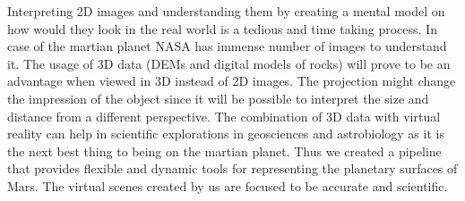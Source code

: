Interpreting 2D images and understanding them by creating a mental model on how would they look in the real world is a tedious and time taking process. In case of the martian planet NASA has immense number of images to understand it. The usage of 3D data (DEMs and digital models of rocks) will prove to be an advantage when viewed in 3D instead of 2D images. The projection might change the impression of the object since it will be possible to interpret the size and distance from a different perspective. The combination of 3D data with virtual reality can help in scientific explorations in geosciences and astrobiology as it is the next best thing to being on the martian planet. Thus we created a pipeline that provides flexible and dynamic tools for representing the planetary surfaces of Mars. The virtual scenes created by us are focused to be accurate and scientific. 

